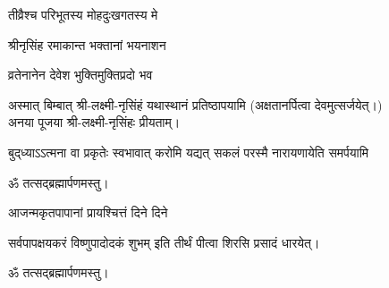 \begin{center}
{तीव्रैश्च  परिभूतस्य   मोहदुःखगतस्य   मे}

{श्रीनृसिंह   रमाकान्त   भक्तानां   भयनाशन}

{व्रतेनानेन   देवेश   भुक्तिमुक्तिप्रदो   भव}

\medskip

अस्मात् बिम्बात् श्री-लक्ष्मी-नृसिंहं यथास्थानं प्रतिष्ठापयामि (अक्षतानर्पित्वा देवमुत्सर्जयेत्।)\\
अनया पूजया श्री-लक्ष्मी-नृसिंहः प्रीयताम्।\medskip

{बुद्‌ध्याऽऽत्मना वा प्रकृतेः स्वभावात्}
{करोमि यद्यत् सकलं परस्मै}
{नारायणायेति समर्पयामि}


ॐ तत्सद्ब्रह्मार्पणमस्तु।\medskip

{आजन्मकृतपापानां प्रायश्चित्तं दिने दिने}

{सर्वपापक्षयकरं विष्णुपादोदकं शुभम्}
 इति तीर्थं पीत्वा शिरसि प्रसादं धारयेत्।

\end{center}



ॐ तत्सद्ब्रह्मार्पणमस्तु।


\closesection